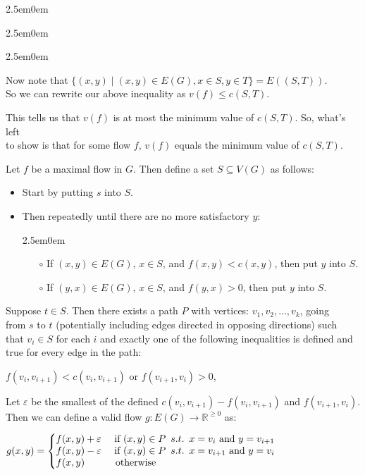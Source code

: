 \documentclass{book}
\newenvironment{myIndent}{%
   \begin{adjustwidth}{2.5em}{0em}%
}{%
   \end{adjustwidth}%
}
\newcommand{\suchthat}{ \hspace{0.5em}s.t.\hspace{0.5em}}
\newcommand{\retTwo}{\hfill\bigbreak}
\begin{document}
{\begin{myIndent}
{\begin{myIndent}
{\begin{myIndent}
         Now note that $\{(x, y) \mid (x, y) \in E(G), x \in S, y \in T\} = E((S, T))$.\\
         So we can rewrite our above inequality as $v(f) \leq c(S, T)$.\retTwo
      \end{myIndent}}

      This tells us that $v(f)$ is at most the minimum value of $c(S, T)$. So, what's left\\ to show is that for some flow $f$, $v(f)$ equals the minimum value of $c(S, T)$.\retTwo

      Let $f$ be a maximal flow in $G$. Then define a set $S \subseteq V(G)$ as follows:
      \begin{itemize}
         \item Start by putting $s$ into $S$.
         \item Then repeatedly until there are no more satisfactory $y$:
         \begin{myIndent}
            \begin{itemize}
               \item[$\circ$] If $(x, y) \in E(G)$, $x \in S$, and $f(x, y) < c(x, y)$, then put $y$ into $S$.
               \item[$\circ$] If $(y, x) \in E(G)$, $x \in S$, and $f(y, x) > 0$, then put $y$ into $S$. 
            \end{itemize}
         \end{myIndent}
      \end{itemize}

      \newpage

      Suppose $t \in S$. Then there exists a path $P$ with vertices: $v_1, v_2, \ldots, v_k$, going\\ from $s$ to $t$ (potentially including edges directed in opposing directions) such\\ that $v_i \in S$ for each $i$ and exactly one of the following inequalities is defined and true for every edge in the path:
      
      {\centering $f(v_i, v_{i+1}) < c(v_i, v_{i+1})$ or $f(v_{i+1}, v_i) > 0$,\retTwo\par}

      Let $\varepsilon$ be the smallest of the defined $c(v_i, v_{i+1}) - f(v_i, v_{i+1})$ and $f(v_{i+1}, v_i)$. Then we can define a valid flow $g: E(G) \rightarrow \mathbb{R}^{\geq 0}$ as:

      \begin{center}
         $g(x, y) = \left\{
         \begin{matrix}
            f(x, y) + \varepsilon & \text{ if } (x, y) \in P \suchthat x = v_i \text{ and } y = v_{i+1} \\
            f(x, y) - \varepsilon & \text{ if } (x, y) \in P \suchthat x = v_{i+1} \text{ and } y = v_{i} \\
            f(x, y)\phantom{\vphantom{.}+ \varepsilon} & \text{ otherwise }\phantom{aaaaaaaaaaaaaaaaaaaaaa}
         \end{matrix}\right.$\retTwo
      \end{center}


\end{myIndent}}
\end{myIndent}}
\end{document}
